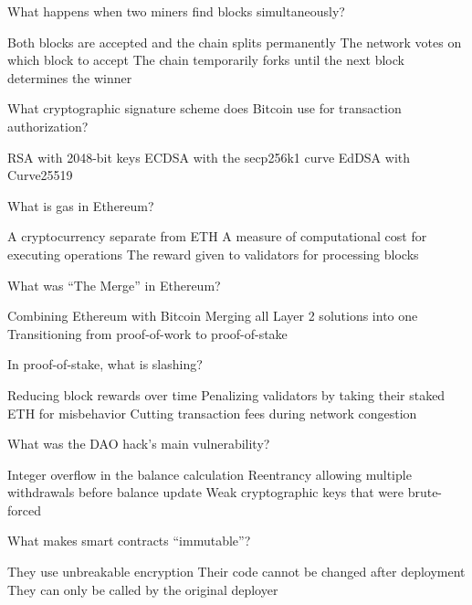 \documentclass[10pt,a4paper,american]{exam}
\begin{document}
\begin{questions}
	\question What happens when two miners find blocks simultaneously?
	\begin{randomizechoices}
		\choice Both blocks are accepted and the chain splits permanently
		\choice The network votes on which block to accept
		\CorrectChoice The chain temporarily forks until the next block determines the winner
	\end{randomizechoices}

	\question What cryptographic signature scheme does Bitcoin use for transaction authorization?
	\begin{randomizechoices}
		\choice RSA with 2048-bit keys
		\CorrectChoice ECDSA with the secp256k1 curve
		\choice EdDSA with Curve25519
	\end{randomizechoices}

	\question What is gas in Ethereum?
	\begin{randomizechoices}
		\choice A cryptocurrency separate from ETH
		\CorrectChoice A measure of computational cost for executing operations
		\choice The reward given to validators for processing blocks
	\end{randomizechoices}

	\question What was ``The Merge'' in Ethereum?
	\begin{randomizechoices}
		\choice Combining Ethereum with Bitcoin
		\choice Merging all Layer 2 solutions into one
		\CorrectChoice Transitioning from proof-of-work to proof-of-stake
	\end{randomizechoices}

	\question In proof-of-stake, what is slashing?
	\begin{randomizechoices}
		\choice Reducing block rewards over time
		\CorrectChoice Penalizing validators by taking their staked ETH for misbehavior
		\choice Cutting transaction fees during network congestion
	\end{randomizechoices}

	\question What was the DAO hack's main vulnerability?
	\begin{randomizechoices}
		\choice Integer overflow in the balance calculation
		\CorrectChoice Reentrancy allowing multiple withdrawals before balance update
		\choice Weak cryptographic keys that were brute-forced
	\end{randomizechoices}

	\question What makes smart contracts ``immutable''?
	\begin{randomizechoices}
		\choice They use unbreakable encryption
		\CorrectChoice Their code cannot be changed after deployment
		\choice They can only be called by the original deployer
	\end{randomizechoices}


\end{questions}
\end{document}
